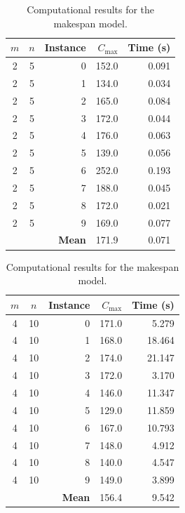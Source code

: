 \documentclass{article}
\begin{document}
\begin{table}[ht]
\centering
\caption{Computational results for the makespan model.}
\label{tab:results_cmax}
\renewcommand{\arraystretch}{1.3}
\begin{minipage}{0.48\linewidth}
\centering
{}
\label{tab:results_cmax_small}
\begin{tabular}{ccrrr}
\toprule
$m$ & $n$ & Instance & $C_{\max}$ & Time (s) \\
\midrule
2 & 5 & 0 & 152.0 & 0.091 \\
2 & 5 & 1 & 134.0 & 0.034 \\
2 & 5 & 2 & 165.0 & 0.084 \\
2 & 5 & 3 & 172.0 & 0.044 \\
2 & 5 & 4 & 176.0 & 0.063 \\
2 & 5 & 5 & 139.0 & 0.056 \\
2 & 5 & 6 & 252.0 & 0.193 \\
2 & 5 & 7 & 188.0 & 0.045 \\
2 & 5 & 8 & 172.0 & 0.021 \\
2 & 5 & 9 & 169.0 & 0.077 \\ \hline
& &\textbf{Mean} & 171.9 & 0.071 \\
\bottomrule
\end{tabular}
\end{minipage}
\hfill
\begin{minipage}{0.48\linewidth}
\centering
{}
\label{tab:results_cmax_medium}
\begin{tabular}{ccrrr}
\toprule
$m$ & $n$ & Instance & $C_{\max}$ & Time (s) \\
\midrule
4 & 10 & 0 & 171.0 &  5.279 \\
4 & 10 & 1 & 168.0 & 18.464 \\
4 & 10 & 2 & 174.0 & 21.147 \\
4 & 10 & 3 & 172.0 &  3.170 \\
4 & 10 & 4 & 146.0 & 11.347 \\
4 & 10 & 5 & 129.0 & 11.859 \\
4 & 10 & 6 & 167.0 & 10.793 \\
4 & 10 & 7 & 148.0 &  4.912 \\
4 & 10 & 8 & 140.0 &  4.547 \\
4 & 10 & 9 & 149.0 &  3.899 \\ \hline
& &\textbf{Mean} & 156.4 & 9.542 \\
\bottomrule
\end{tabular}
\end{minipage}
\end{table}
\end{document}
